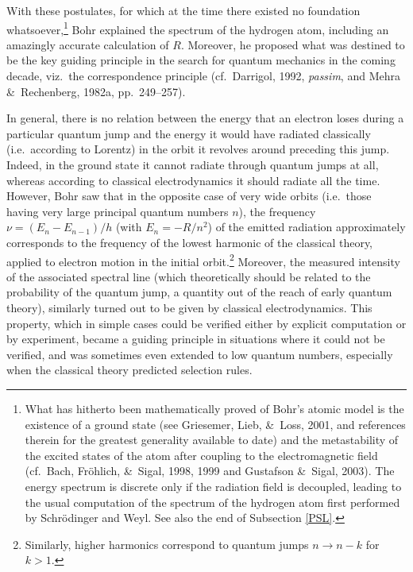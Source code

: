 \documentclass[12pt,titlepage]{article}
\newcommand{\raw}{\rightarrow} \newcommand{\rat}{\mapsto}
\begin{document}
With these postulates, for which at the time there existed no foundation whatsoever,\footnote{\label{SigalF}What has hitherto been mathematically proved of Bohr's atomic model  is the existence of a ground state (see Griesemer,  Lieb, \&\ Loss, 2001, and references therein for the greatest generality available to date) and the metastability of the excited states of the atom after coupling to the electromagnetic field (cf.\ Bach, Fr\"{o}hlich, \&\  Sigal, 1998,  1999 and Gustafson \&\ Sigal, 2003). The energy spectrum is discrete only if the radiation field is decoupled, leading to the usual computation of the
spectrum of the hydrogen atom first performed by Schr\"{o}dinger and Weyl. See also the end of Subsection \ref{PSL}.}
 Bohr explained the spectrum of the hydrogen atom, including an amazingly accurate calculation of  $R$.
Moreover, he proposed what was destined to be the key guiding principle in the search for quantum mechanics in the coming decade, viz.\ the correspondence principle (cf.\ Darrigol, 1992, {\it passim},  and Mehra \&\ Rechenberg, 1982a, pp.\ 249--257). 

In general, there is no relation between the energy that an electron loses during a particular quantum jump and the energy it would have radiated classically (i.e.\ according to Lorentz) in the orbit it revolves around preceding this jump. Indeed, in the ground state it cannot radiate through quantum jumps  at all, whereas according to classical electrodynamics it should radiate  all the time. However, Bohr saw that in the opposite case of very wide orbits (i.e.\ those having very large principal quantum numbers $n$),
the frequency $\nu=(E_n-E_{n-1})/h$ (with $E_n=-R/n^2$) of the emitted radiation  approximately corresponds to the frequency of the lowest harmonic of the classical theory, applied to electron motion in the initial orbit.\footnote{Similarly,  higher harmonics correspond to quantum jumps
$n\raw n-k$ for $k>1$.} Moreover, the measured intensity of the associated spectral line (which theoretically should be related to the probability of the quantum jump, a quantity out of the  reach of early quantum theory), similarly turned out to be given by classical electrodynamics.
This property, which in simple cases could be verified either by explicit computation or by experiment, became a guiding principle in situations where it could not be verified, and was sometimes even extended to low quantum numbers, especially when the classical theory predicted selection rules. 
  
\end{document}
